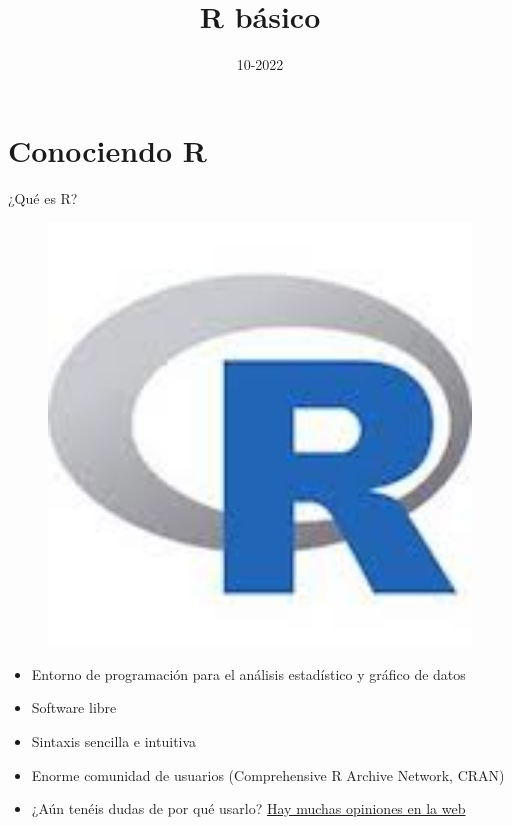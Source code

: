 \documentclass[
  ignorenonframetext,
]{beamer}
\title{R básico}
\author{}
\date{\vspace{-2.5em}10-2022}
\providecommand{\tightlist}{%
  \setlength{\itemsep}{0pt}\setlength{\parskip}{0pt}}
\begin{document}
\frame{\titlepage}

\begin{frame}[allowframebreaks]
  \tableofcontents[hideallsubsections]
\end{frame}
\section{Conociendo R}\label{conociendo-r}

\begin{frame}{¿Qué es R?}
\label{quuxe9-es-r}
\begin{figure}
\includegraphics[width=450px]{Imgs/Rlogo} \end{figure}

\begin{itemize}
\tightlist
\item
  Entorno de programación para el análisis estadístico y gráfico de
  datos
\item
  Software libre
\item
  Sintaxis sencilla e intuitiva
\item
  Enorme comunidad de usuarios (Comprehensive R Archive Network, CRAN)
\item
  ¿Aún tenéis dudas de por qué usarlo?
  \href{https://www.google.com/search?q=Why+use+R&rlz=1C1CHBF_esES891ES891&sxsrf=ALiCzsY4-woeo8PpPd0yw3j3b8guwp9zZQ\%3A1664188143209&ei=734xY5C1DOaIur4PjI2XoAU&ved=0ahUKEwjQ6PX4n7L6AhVmhM4BHYzGBVQQ4dUDCA4&uact=5&oq=Why+use+R&gs_lcp=Cgdnd3Mtd2l6EAMyCggAEEcQ1gQQsAMyCggAEEcQ1gQQsAMyCggAEEcQ1gQQsAMyCggAEEcQ1gQQsAMyCggAEEcQ1gQQsAMyCggAEEcQ1gQQsAMyCggAEEcQ1gQQsAMyCggAEEcQ1gQQsAMyBwgAELADEENKBAhBGABKBAhGGABQAFgAYIMMaAFwAHgAgAEAiAEAkgEAmAEAyAEJwAEB&sclient=gws-wiz}{Hay
  muchas opiniones en la web}
\end{itemize}
\end{frame}
\end{document}
